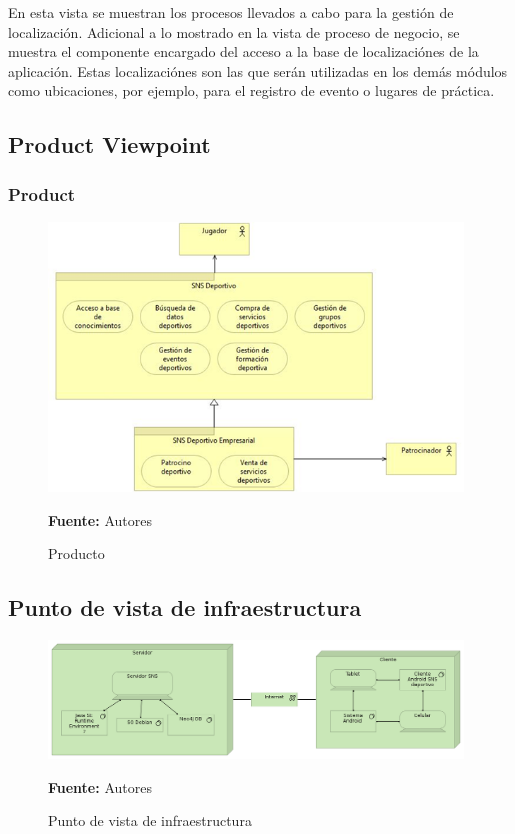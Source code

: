 En esta vista se muestran los procesos llevados a cabo para la gestión de localización. Adicional a lo mostrado en la vista de proceso de negocio, se muestra el componente encargado del acceso a la base de localizaciónes de la aplicación. Estas localizaciónes son las que serán utilizadas en los demás módulos como ubicaciones, por ejemplo, para el registro de evento o lugares de práctica.

\subsection{Product Viewpoint}

\subsubsection{Product}

\begin{figure}[!htb]
  \begin{center}
    \includegraphics[width=11cm]{./imagenes/Archimate/vistas/generales/Product.png}
    \caption{Producto}
    \label{fig:Product}
    \textbf{Fuente:}  Autores
  \end{center}
\end{figure}

\subsection{Punto de vista de infraestructura}

\begin{figure}[!htb]
  \begin{center}
    \includegraphics[width=11cm]{./imagenes/Archimate/vistas/generales/infrastructure.png}
    \caption{Punto de vista de infraestructura}
    \label{fig:infrastructure}
    \textbf{Fuente:}  Autores
  \end{center}
\end{figure}

